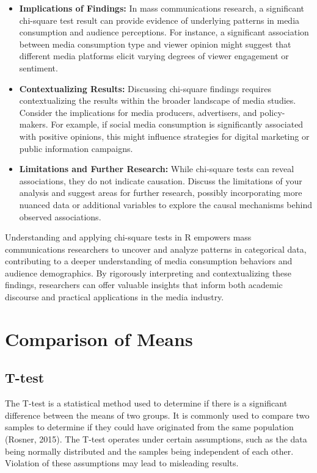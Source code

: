\documentclass[
]{book}
\begin{document}
\begin{itemize}
\item
  \textbf{Implications of Findings:} In mass communications research, a significant chi-square test result can provide evidence of underlying patterns in media consumption and audience perceptions. For instance, a significant association between media consumption type and viewer opinion might suggest that different media platforms elicit varying degrees of viewer engagement or sentiment.
\item
  \textbf{Contextualizing Results:} Discussing chi-square findings requires contextualizing the results within the broader landscape of media studies. Consider the implications for media producers, advertisers, and policy-makers. For example, if social media consumption is significantly associated with positive opinions, this might influence strategies for digital marketing or public information campaigns.
\item
  \textbf{Limitations and Further Research:} While chi-square tests can reveal associations, they do not indicate causation. Discuss the limitations of your analysis and suggest areas for further research, possibly incorporating more nuanced data or additional variables to explore the causal mechanisms behind observed associations.
\end{itemize}

Understanding and applying chi-square tests in R empowers mass communications researchers to uncover and analyze patterns in categorical data, contributing to a deeper understanding of media consumption behaviors and audience demographics. By rigorously interpreting and contextualizing these findings, researchers can offer valuable insights that inform both academic discourse and practical applications in the media industry.

\section{Comparison of Means}\label{comparison-of-means}

\subsection*{T-test}\label{t-test}

The T-test is a statistical method used to determine if there is a significant difference between the means of two groups. It is commonly used to compare two samples to determine if they could have originated from the same population (Rosner, 2015). The T-test operates under certain assumptions, such as the data being normally distributed and the samples being independent of each other. Violation of these assumptions may lead to misleading results.
\end{document}
